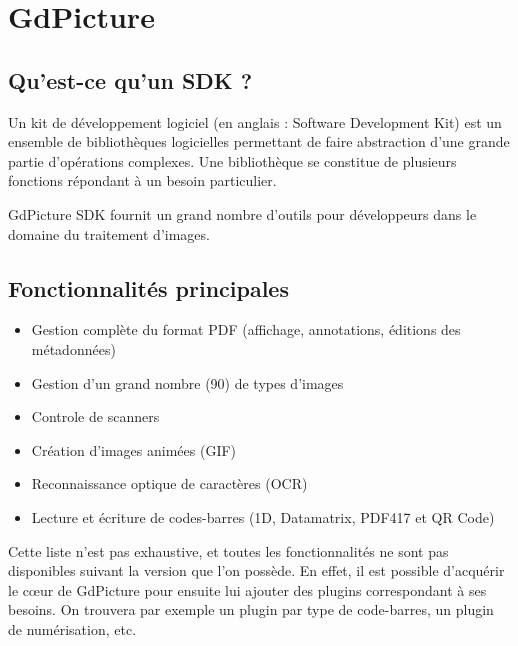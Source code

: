 \chapter{GdPicture}
\label{gdpicture}

\section{Qu'est-ce qu'un SDK ?}

Un kit de développement logiciel (en anglais : Software Development Kit) est un ensemble de bibliothèques logicielles permettant de faire abstraction d'une grande partie d'opérations complexes. Une bibliothèque se constitue de plusieurs fonctions répondant à un besoin particulier.

GdPicture SDK fournit un grand nombre d'outils pour développeurs dans le domaine du traitement d'images.

\section{Fonctionnalités principales}

\begin{itemize}
\item Gestion complète du format PDF (affichage, annotations, éditions des métadonnées)
\item Gestion d'un grand nombre (90) de types d'images
\item Controle de scanners
\item Création d'images animées (GIF)
\item Reconnaissance optique de caractères (OCR)
\item Lecture et écriture de codes-barres (1D, Datamatrix, PDF417 et QR Code)
\end{itemize}

Cette liste n'est pas exhaustive, et toutes les fonctionnalités ne sont pas disponibles suivant la version que l'on possède. En effet, il est possible d'acquérir le c\oe ur de GdPicture pour ensuite lui ajouter des plugins correspondant à ses besoins. On trouvera  par exemple un plugin par type de code-barres, un plugin de numérisation, etc.